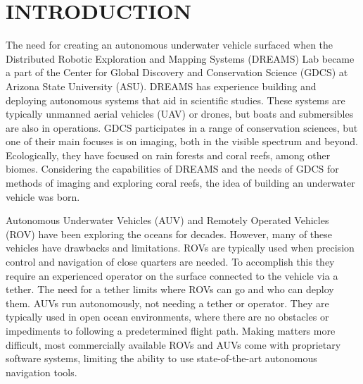 \chapter{INTRODUCTION}

The need for creating an autonomous underwater vehicle surfaced when the Distributed Robotic Exploration and Mapping Systems (DREAMS) Lab became a part of the Center for Global Discovery and Conservation Science (GDCS) at Arizona State University (ASU). DREAMS has experience building and deploying autonomous systems that aid in scientific studies. These systems are typically unmanned aerial vehicles (UAV) or drones, but boats and submersibles are also in operations. GDCS participates in a range of conservation sciences, but one of their main focuses is on imaging, both in the visible spectrum and beyond. Ecologically, they have focused on rain forests and coral reefs, among other biomes. Considering the capabilities of DREAMS and the needs of GDCS for methods of imaging and exploring coral reefs, the idea of building an underwater vehicle was born.

Autonomous Underwater Vehicles (AUV) and Remotely Operated Vehicles (ROV) have been exploring the oceans for decades. However, many of these vehicles have drawbacks and limitations. ROVs are typically used when precision control and navigation of close quarters are needed. To accomplish this they require an experienced operator on the surface connected to the vehicle via a tether. The need for a tether limits where ROVs can go and who can deploy them. AUVs run autonomously, not needing a tether or operator. They are typically used in open ocean environments, where there are no obstacles or impediments to following a predetermined flight path. Making matters more difficult, most commercially available ROVs and AUVs come with proprietary software systems, limiting the ability to use state-of-the-art autonomous navigation tools. 

